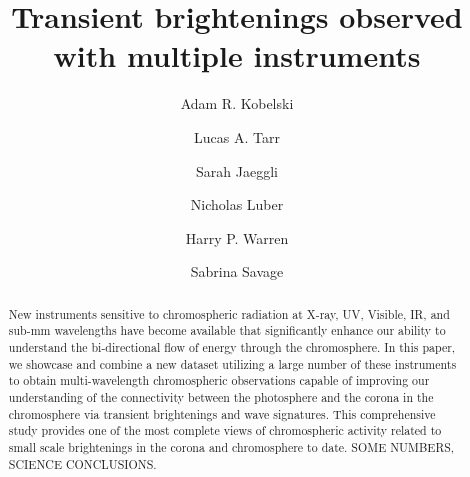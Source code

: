 \documentclass[twocolumn]{aastex62}
\begin{document}
\title{Transient brightenings observed with multiple instruments}

\author[0000-0002-4691-1729]{Adam R. Kobelski}


\author[0000-0002-8259-8303]{Lucas A. Tarr}
\author[0000-0001-5459-2628]{Sarah Jaeggli}
\author{Nicholas Luber}
\author[0000-0001-6102-6851]{Harry P. Warren}
\author[0000-0002-6172-0517]{Sabrina Savage}

\begin{abstract}
New instruments sensitive to chromospheric radiation at X-ray, UV, Visible, IR, and sub-mm wavelengths have become available that significantly enhance our ability to understand the bi-directional flow of energy through the chromosphere. In this paper, we showcase and combine a new dataset utilizing a large number of these instruments to obtain multi-wavelength chromospheric observations capable of improving our understanding of the connectivity between the photosphere and the corona in the chromosphere via transient brightenings and wave signatures. This comprehensive study provides one of the most complete views of chromospheric activity related to small scale brightenings in the corona and chromosphere to date. SOME NUMBERS, SCIENCE CONCLUSIONS.

\end{abstract}
\end{document}
